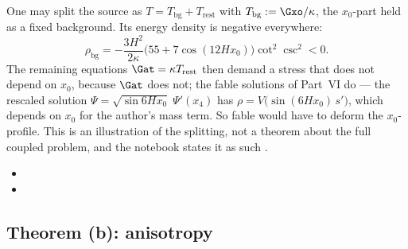 One may split the source as $T=T_{\mathrm{bg}}+T_{\mathrm{rest}}$ with $T_{\mathrm{bg}}:=\Gxo/\kappa$,
the $x_0$-part held as a fixed background. Its energy density is negative everywhere:
\[
  \rho_{\mathrm{bg}}=-\frac{3H^2}{2\kappa}\bigl(55+7\cos(12Hx_0)\bigr)\cot^2\csc^2<0 .
\]
The remaining equations $\Gat=\kappa T_{\mathrm{rest}}$ then demand a stress that does not depend on
$x_0$, because $\Gat$ does not; the fable solutions of Part~VI do --- the rescaled solution
$\Psi=\sqrt{\sin 6Hx_0}\;\Psi'(x_4)$ has $\rho=V\bigl(\sin(6Hx_0)\,s'\bigr)$, which depends on $x_0$ for the
author's mass term. So fable would have to deform the $x_0$-profile. This is an illustration of the
splitting, not a theorem about the full coupled problem, and the notebook states it as such
. 
\begin{itemize}
  \item {}
  \item {}
\end{itemize}

\subsection{Theorem (b): anisotropy}
\label{sec:4.6}

